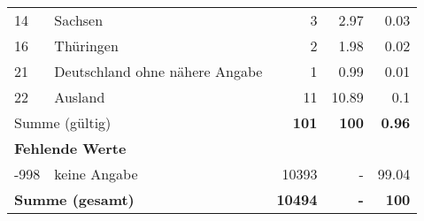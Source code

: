 \begin{longtable}{lXrrr}
     14 &
     \multicolumn{1}{X}{ Sachsen   } &


       \num{3} &
       \num[round-mode=places,round-precision=2]{2,97} &
         \num[round-mode=places,round-precision=2]{0,03} \\

     16 &
     \multicolumn{1}{X}{ Thüringen   } &


       \num{2} &
       \num[round-mode=places,round-precision=2]{1,98} &
         \num[round-mode=places,round-precision=2]{0,02} \\

     21 &
     \multicolumn{1}{X}{ Deutschland ohne nähere Angabe   } &


       \num{1} &
       \num[round-mode=places,round-precision=2]{0,99} &
         \num[round-mode=places,round-precision=2]{0,01} \\

     22 &
     \multicolumn{1}{X}{ Ausland   } &


       \num{11} &
       \num[round-mode=places,round-precision=2]{10,89} &
         \num[round-mode=places,round-precision=2]{0,1} \\
     \midrule
     \multicolumn{2}{l}{Summe (gültig)} &
       \textbf{\num{101}} &
     \textbf{100} &
       \textbf{\num[round-mode=places,round-precision=2]{0,96}} \\
     \multicolumn{5}{l}{\textbf{Fehlende Werte}}\\
       -998 &
       keine Angabe &
         \num{10393} &
        - &
         \num[round-mode=places,round-precision=2]{99,04} \\
     \midrule
     \multicolumn{2}{l}{\textbf{Summe (gesamt)}} &
          \textbf{\num{10494}} &
        \textbf{-} &
        \textbf{100} \\
     \bottomrule
     \end{longtable}
     
